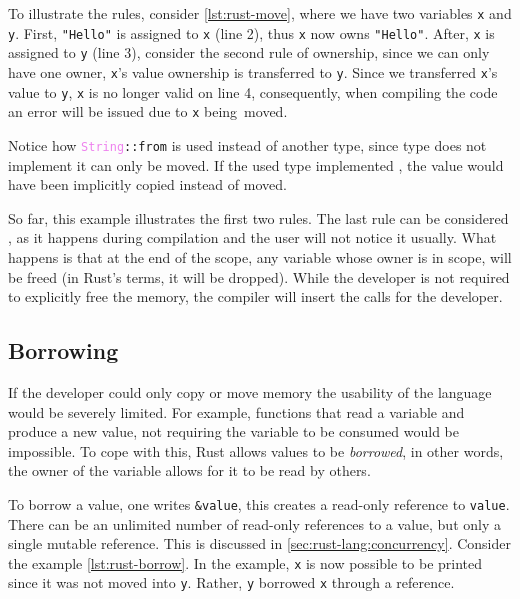 To illustrate the rules, consider \autoref{lst:rust-move}, where we have two variables \texttt{x} and \texttt{y}.
First, \texttt{"Hello"} is assigned to \texttt{x} (line 2), thus \texttt{x} now owns \texttt{"Hello"}.
After, \texttt{x} is assigned to \texttt{y} (line 3),
consider the second rule of ownership, since we can only have one owner,
\texttt{x}'s value ownership is transferred to \texttt{y}.
Since we transferred \texttt{x}'s value to \texttt{y}, \texttt{x} is no longer valid on line 4, consequently,
when compiling the code an error will be issued due to \texttt{x} being~moved.

Notice how \texttt{\textcolor{violet}{String}::from} is used instead of another type,
since  type does not implement  it can only be moved.
If the used type implemented , the value would have been implicitly copied instead of moved.



So far, this example illustrates the first two rules. The last rule can be considered ,
as it happens during compilation and the user will not notice it usually.
What happens is that at the end of the scope, any variable whose owner is in scope,
will be freed (in Rust's terms, it will be dropped).
While the developer is not required to explicitly free the memory, the compiler will insert the calls for the developer.

\subsection{Borrowing}\label{sec:rust-lang:borrowing}

If the developer could only copy or move memory the usability of the language would be severely limited.
For example, functions that read a variable and produce a new value,
not requiring the variable to be consumed would be impossible.
To cope with this, Rust allows values to be \emph{borrowed}, in other words,
the owner of the variable allows for it to be read by others.

To borrow a value, one writes \texttt{\&value}, this creates a read-only reference to \texttt{value}.
There can be an unlimited number of read-only references to a value, but only a single mutable reference.
This is discussed in \autoref{sec:rust-lang:concurrency}. Consider the example \autoref{lst:rust-borrow}.
In the example, \texttt{x} is now possible to be printed since it was not moved into \texttt{y}.
Rather, \texttt{y} borrowed \texttt{x} through a reference.

